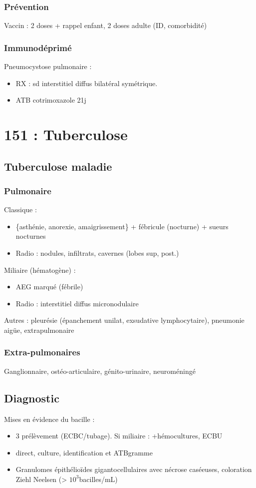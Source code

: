 \documentclass{article}
\begin{document}
\subsubsection{Prévention}
Vaccin : 2 doses + rappel enfant, 2 doses adulte (ID, comorbidité)

\subsubsection{Immunodéprimé}
Pneumocystose pulmonaire : 
\begin{itemize}
\item RX : sd interstitiel diffus bilatéral symétrique.
\item ATB cotrimoxazole 21j
\end{itemize}

\section{151 : Tuberculose}
\subsection{Tuberculose maladie}
\subsubsection{Pulmonaire}
Classique : 
\begin{itemize}
\item \{asthénie, anorexie, amaigrissement\} + fébricule (nocturne) + sueurs nocturnes
\item Radio : nodules, infiltrats, cavernes (lobes sup, post.)
\end{itemize}
Miliaire (hématogène) :
\begin{itemize}
\item AEG marqué (fébrile)
\item Radio : interstitiel diffus micronodulaire
\end{itemize}
Autres : pleurésie (épanchement unilat, exsudative lymphocytaire), pneumonie
aigüe, extrapulmonaire
\subsubsection{Extra-pulmonaires}
Ganglionnaire, ostéo-articulaire, génito-urinaire, neuroméningé
\subsection{Diagnostic}
Mises en évidence du bacille :
\begin{itemize}
\item 3 prélèvement (ECBC/tubage). Si miliaire : +hémocultures, ECBU
\item direct, culture, identification et ATBgramme
\item Granulomes épithélioïdes gigantocellulaires avec nécrose caséeuses,
  coloration Ziehl Neelsen (> $10^3$bacilles/mL)
\end{itemize}
\end{document}
